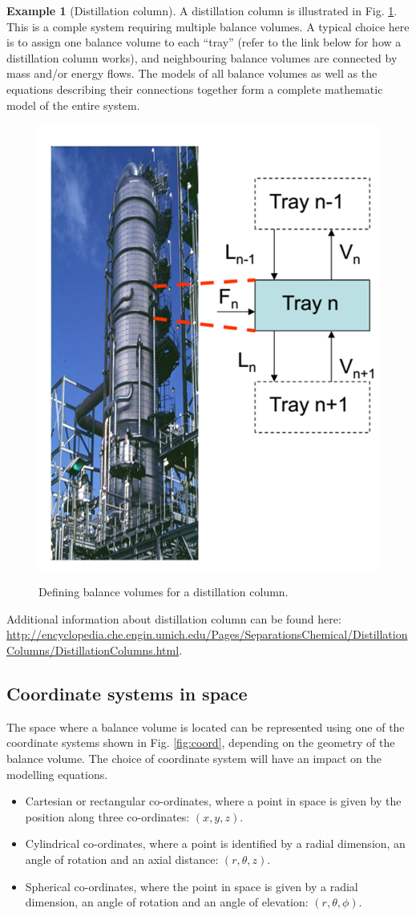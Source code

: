 \documentclass[a4paper,11pt]{article}
\theoremstyle{definition}
\newtheorem{exmp}{Example}[section]
\begin{document}
\begin{exmp}[Distillation column]
\label{exmp:dist}
A  distillation column is illustrated in Fig. \ref{fig:dist}. This is a comple system requiring multiple balance volumes.
A typical choice here is to assign one balance volume to each ``tray'' (refer to the link below for how a distillation column works),
and neighbouring balance volumes are connected by mass and/or energy flows.
The models of all balance volumes as well as the equations describing their connections together form a complete mathematic model of the entire system.

\begin{figure} [!h]
 \begin{center}
	\includegraphics[width=.3\textwidth]{dist}\\
 \end{center}
 \caption{Defining balance volumes for a distillation column.} 
 \label{fig:dist}
\end{figure}

Additional information about distillation column can be found here:
\url{http://encyclopedia.che.engin.umich.edu/Pages/SeparationsChemical/DistillationColumns/DistillationColumns.html}.

\end{exmp}


\subsection*{Coordinate systems in space}

The space where a balance volume is located can be represented using 
one of the coordinate systems shown in Fig. \ref{fig:coord}, depending on the geometry of the balance volume.
The choice of coordinate system will have an impact on the modelling equations.
\begin{itemize}
	\item Cartesian or rectangular co-ordinates, where a point in space is given by the position along three co-ordinates: 
		$(x, y, z)$.
	\item Cylindrical co-ordinates, where a point is identified by a radial dimension, an angle of rotation and an axial distance: 
		$(r, \theta, z)$.
	\item Spherical co-ordinates, where the point in space is given by a radial dimension, an angle of rotation and an angle of elevation: 
		$(r, \theta, \phi)$.
\end{itemize}
\end{document}
